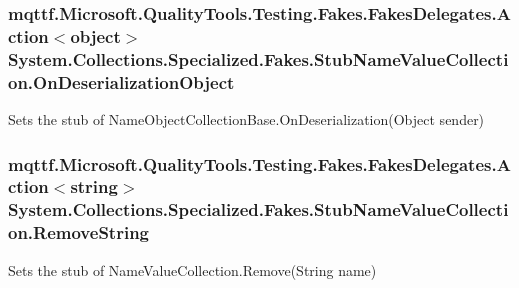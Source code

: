 \hypertarget{class_system_1_1_collections_1_1_specialized_1_1_fakes_1_1_stub_name_value_collection_a6132cac1dba372f60e21a03e11aaa6f7}{
\subsubsection[{On\-Deserialization\-Object}]{\setlength{\rightskip}{0pt plus 5cm}mqttf.\-Microsoft.\-Quality\-Tools.\-Testing.\-Fakes.\-Fakes\-Delegates.\-Action$<$object$>$ System.\-Collections.\-Specialized.\-Fakes.\-Stub\-Name\-Value\-Collection.\-On\-Deserialization\-Object}}\label{class_system_1_1_collections_1_1_specialized_1_1_fakes_1_1_stub_name_value_collection_a6132cac1dba372f60e21a03e11aaa6f7}


Sets the stub of Name\-Object\-Collection\-Base.\-On\-Deserialization(\-Object sender)

\hypertarget{class_system_1_1_collections_1_1_specialized_1_1_fakes_1_1_stub_name_value_collection_a71b645de330903616787074729c156ee}{
\subsubsection[{Remove\-String}]{\setlength{\rightskip}{0pt plus 5cm}mqttf.\-Microsoft.\-Quality\-Tools.\-Testing.\-Fakes.\-Fakes\-Delegates.\-Action$<$string$>$ System.\-Collections.\-Specialized.\-Fakes.\-Stub\-Name\-Value\-Collection.\-Remove\-String}}\label{class_system_1_1_collections_1_1_specialized_1_1_fakes_1_1_stub_name_value_collection_a71b645de330903616787074729c156ee}


Sets the stub of Name\-Value\-Collection.\-Remove(\-String name)


